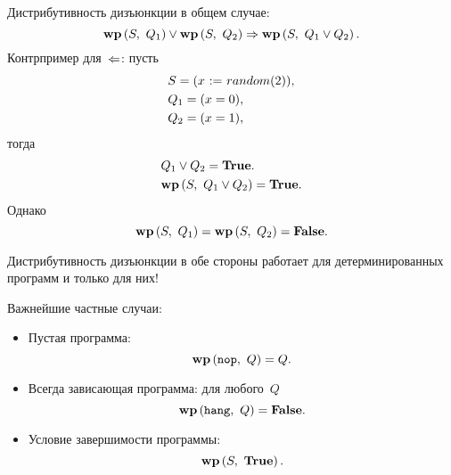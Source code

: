 \documentclass[landscape]{slides}
\begin{document}
\begin{slide}
        Дистрибутивность дизъюнкции в общем случае:
        \[
                \mathbf{wp}\left({S},\ {Q_1}\right) \lor \mathbf{wp}\left({S},\ {Q_2}\right) \Rightarrow \mathbf{wp}\left({S},\ {Q_1 \lor Q_2}\right) .
        \]
        Контрпример для~$\Leftarrow$: пусть
        \begin{eqnarray*}
                &S = (x \ \mathtt{:=}\  random(2)),\\
                &Q_1 = (x = 0),\\
                &Q_2 = (x = 1),
        \end{eqnarray*}
        тогда
        \begin{eqnarray*}
                &Q_1 \lor Q_2 = \mathbf{True}.\\
                &\mathbf{wp}\left({S},\ {Q_1 \lor Q_2}\right) = \mathbf{True} .
        \end{eqnarray*}
        Однако
        \[
                \mathbf{wp}\left({S},\ {Q_1}\right) = \mathbf{wp}\left({S},\ {Q_2}\right) = \mathbf{False} .
        \]

        Дистрибутивность дизъюнкции в обе стороны работает для детерминированных программ и только для них!
\end{slide}

\begin{slide}
        Важнейшие частные случаи:

        \begin{itemize}
                \item Пустая программа:
                        \[
                                \mathbf{wp}\left({\mathtt{nop}},\ {Q}\right) = Q .
                        \]
                \item Всегда зависающая программа: для любого~$Q$
                        \[
                                \mathbf{wp}\left({\mathtt{hang}},\ {Q}\right) = \mathbf{False} .
                        \]
                \item Условие завершимости программы:
                        \[
                                \mathbf{wp}\left({S},\ {\mathbf{True}}\right) .
                        \]
        \end{itemize}
\end{slide}
\end{document}
